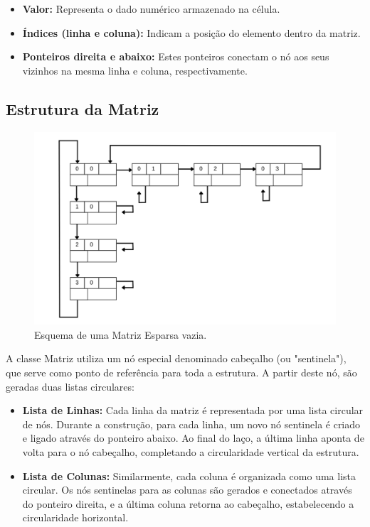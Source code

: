 \documentclass[12pt]{article}
\begin{document}
\begin{itemize}
    \item \textbf{Valor:} Representa o dado numérico armazenado na célula.
    \item \textbf{Índices (linha e coluna):} Indicam a posição do elemento dentro da matriz.
    \item  \textbf{Ponteiros direita e abaixo:} Estes ponteiros conectam o nó aos seus vizinhos na mesma linha e coluna, respectivamente.
\end{itemize}

\subsection{Estrutura da Matriz}

\begin{figure}[ht]
    \centering
    \includegraphics[width=.8\textwidth]{matrixVazia.png}
    \caption{Esquema de uma Matriz Esparsa vazia.}
    \label{fig:Esquema de uma Matriz Esparsa vazia}
\end{figure}

A classe Matriz utiliza um nó especial denominado cabeçalho (ou "sentinela"), que serve como ponto de referência para toda a estrutura. A partir deste nó, são geradas duas listas circulares:

\begin{itemize}
    \item \textbf{Lista de Linhas:} Cada linha da matriz é representada por uma lista circular de nós. Durante a construção, para cada linha, um novo nó sentinela é criado e ligado através do ponteiro abaixo. Ao final do laço, a última linha aponta de volta para o nó cabeçalho, completando a circularidade vertical da estrutura.
    
    \item \textbf{Lista de Colunas:} Similarmente, cada coluna é organizada como uma lista circular. Os nós sentinelas para as colunas são gerados e conectados através do ponteiro direita, e a última coluna retorna ao cabeçalho, estabelecendo a circularidade horizontal.
\end{itemize}
\end{document}
